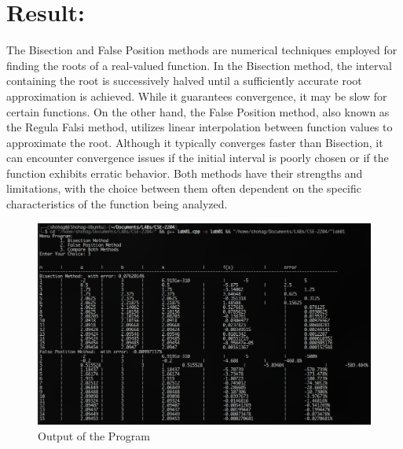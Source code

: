 \documentclass[a4paper,12pt]{report}
\begin{document}
\section*{Result:}
\qquad The Bisection and False Position methods are numerical techniques employed for finding the roots of a real-valued function. In the Bisection method, the interval containing the root is successively halved until a sufficiently accurate root approximation is achieved. While it guarantees convergence, it may be slow for certain functions. On the other hand, the False Position method, also known as the Regula Falsi method, utilizes linear interpolation between function values to approximate the root. Although it typically converges faster than Bisection, it can encounter convergence issues if the initial interval is poorly chosen or if the function exhibits erratic behavior. Both methods have their strengths and limitations, with the choice between them often dependent on the specific characteristics of the function being analyzed.

\begin{figure}[H]
    \centering
    \includegraphics[width=\textwidth]{result.png}
    \caption{Output of the Program}
    \label{fig:result}
\end{figure}
\end{document}
